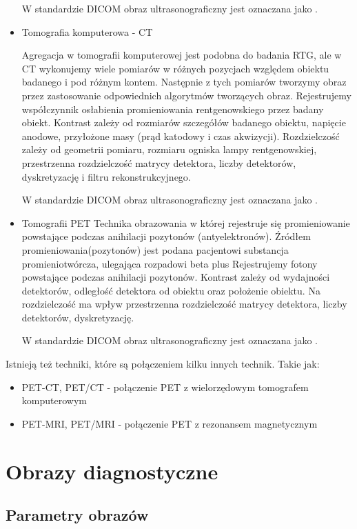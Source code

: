 \begin{itemize}
    W standardzie DICOM obraz ultrasonograficzny jest oznaczana jako .

    \item Tomografia komputerowa - CT
    
    Agregacja w tomografii komputerowej jest podobna do badania RTG, ale w CT wykonujemy wiele pomiarów w różnych pozycjach względem obiektu badanego i pod różnym kontem.
    Następnie z tych pomiarów tworzymy obraz przez zastosowanie odpowiednich algorytmów tworzących obraz.
    Rejestrujemy współczynnik osłabienia promieniowania rentgenowskiego przez badany obiekt.
    Kontrast zależy od rozmiarów szczegółów badanego obiektu, napięcie anodowe, przyłożone masy (prąd katodowy i czas akwizycji).
    Rozdzielczość zależy od geometrii pomiaru, rozmiaru ogniska lampy rentgenowskiej, przestrzenna rozdzielczość matrycy detektora, liczby detektorów, dyskretyzację i filtru rekonstrukcyjnego.

    W standardzie DICOM obraz ultrasonograficzny jest oznaczana jako .

    \item Tomografii PET
    Technika obrazowania w której rejestruje się promieniowanie powstające podczas anihilacji pozytonów (antyelektronów).
    Źródłem promieniowania(pozytonów) jest podana pacjentowi substancja promieniotwórcza, ulegająca rozpadowi beta plus
    Rejestrujemy fotony powstające podczas anihilacji pozytonów.
    Kontrast zależy od wydajności detektorów, odległość detektora od obiektu oraz położenie obiektu.
    Na rozdzielczość ma wpływ przestrzenna rozdzielczość matrycy detektora, liczby detektorów, dyskretyzację.

    W standardzie DICOM obraz ultrasonograficzny jest oznaczana jako .
\end{itemize}

Istnieją też techniki, które są połączeniem kilku innych technik.
Takie jak:
\begin{itemize}
    \item PET-CT, PET/CT - połączenie PET z wielorzędowym tomografem komputerowym
    \item PET-MRI, PET/MRI - połączenie PET z rezonansem magnetycznym
\end{itemize}

\section{Obrazy diagnostyczne}

\subsection{Parametry obrazów}


